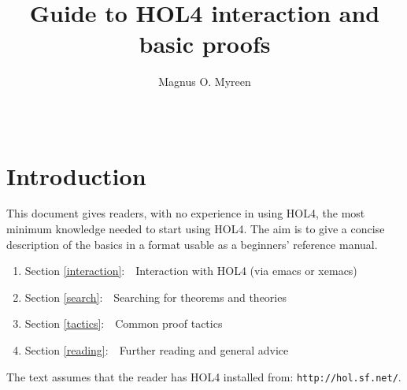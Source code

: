 \documentclass[a4paper,10pt]{article}
\begin{document}
\title{\bf\Large Guide to HOL4 interaction and basic proofs\vspace{-0.3em}}

\author{\normalsize Magnus O. Myreen}
\date{~\vspace{-2em}}

\maketitle

\newcommand{\etal}{{et al$.$}}
\newcommand{\eg}{{e$.$g$.$}}
\newcommand{\ie}{{i$.$e$.$}}

\newenvironment{code}{\begin{quote}\begin{alltt}\small}{\end{alltt}\end{quote}}
\newenvironment{enum}{\begin{enumerate}
\setlength{\itemsep}{-\parsep}
}{\end{enumerate}}


\newcommand{\conj}{\(\begin{array}{c}\texttt{\bf\scriptsize/\textbackslash}\\[0.18em]\end{array}\)}
\newcommand{\mysec}[1]{\section{\large #1}}
\newcommand{\mysubsec}[1]{\subsection{\normalsize#1}}

\mysec{Introduction}

This document gives readers, with no experience in using HOL4, the most
minimum knowledge needed to start using HOL4. The aim is to give a
concise description of the basics in a format usable as a beginners'
reference manual.
\begin{enum}
\item[~] Section \ref{interaction}:~~Interaction with HOL4 (via emacs or xemacs)
\item[~] Section \ref{search}:~~Searching for theorems and theories
\item[~] Section \ref{tactics}:~~Common proof tactics
\item[~] Section \ref{reading}:~~Further reading and general advice
\end{enum}
The text assumes that the reader has HOL4 installed from: {\tt\small http://hol.sf.net/}.
\end{document}
